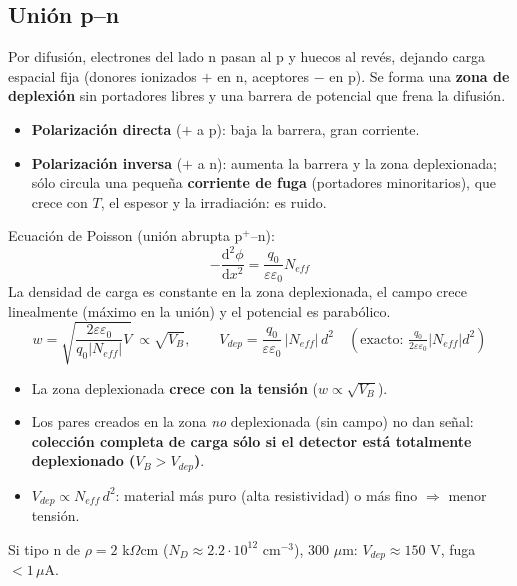 \subsection{Unión p--n}
Por difusión, electrones del lado n pasan al p y huecos al revés, dejando carga espacial fija
(donores ionizados $+$ en n, aceptores $-$ en p). Se forma una \textbf{zona de deplexión} sin portadores
libres y una barrera de potencial que frena la difusión.
\begin{itemize}
\item \textbf{Polarización directa} ($+$ a p): baja la barrera, gran corriente.
\item \textbf{Polarización inversa} ($+$ a n): aumenta la barrera y la zona deplexionada; sólo circula una pequeña
\textbf{corriente de fuga} (portadores minoritarios), que crece con $T$, el espesor y la irradiación: es ruido.
\end{itemize}

\begin{clave}
Ecuación de Poisson (unión abrupta p$^+$--n):
\[ -\frac{\mathrm{d}^2\phi}{\mathrm{d}x^2}=\frac{q_0}{\varepsilon\varepsilon_0}N_{eff} \]
La densidad de carga es constante en la zona deplexionada, el campo crece linealmente (máximo en la unión) y el potencial es parabólico.
\[
w=\sqrt{\frac{2\varepsilon\varepsilon_0}{q_0|N_{eff}|}V}\ \propto\sqrt{V_B},\qquad
V_{dep}=\frac{q_0}{\varepsilon\varepsilon_0}\,|N_{eff}|\,d^2\quad\left(\text{exacto: }\tfrac{q_0}{2\varepsilon\varepsilon_0}|N_{eff}|d^2\right)
\]
\begin{itemize}
\item La zona deplexionada \textbf{crece con la tensión} ($w\propto\sqrt{V_B}$).
\item Los pares creados en la zona \emph{no} deplexionada (sin campo) no dan señal:
\textbf{colección completa de carga sólo si el detector está totalmente deplexionado ($V_B>V_{dep}$)}.
\item $V_{dep}\propto N_{eff}\,d^2$: material más puro (alta resistividad) o más fino $\Rightarrow$ menor tensión.
\end{itemize}
\end{clave}
\begin{dato}
Si tipo n de $\rho=2$ k$\Omega$cm ($N_D\approx2.2\cdot10^{12}$ cm$^{-3}$), 300 $\mu$m: $V_{dep}\approx150$ V, fuga $<1\,\mu$A.
\end{dato}

